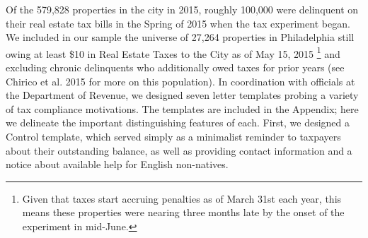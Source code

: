 \documentclass[12pt,titlepage]{article}
\begin{document}
%

Of the 579,828 properties in the city in 2015, roughly 100,000 were
delinquent on their real estate tax bills in the Spring of 2015 when
the tax experiment began. We included in our sample the universe of 27,264
properties in Philadelphia still owing at least \$10 in Real Estate
Taxes to the City as of May 15, 2015
\footnote{
	Given that taxes start accruing penalties as of 
	March 31st each year, this means these properties were 
	nearing three months late by the onset of the 
	experiment in mid-June.
}
and excluding chronic delinquents who additionally owed taxes for 
prior years (see Chirico et al. 2015 for more on this population). 
In coordination with officials at the Department of Revenue, we designed 
seven letter templates probing a variety of tax compliance motivations. 
The templates are included in the Appendix; here we delineate the important 
distinguishing features of each. First, we designed a Control template, which 
served simply as a minimalist reminder to taxpayers about their outstanding 
balance, as well as providing contact information and a notice about 
available help for English non-natives.
\end{document}
